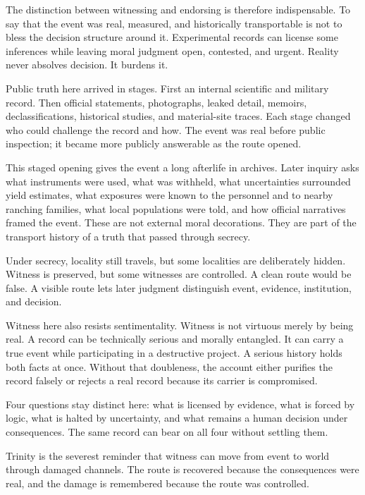 The distinction between witnessing and endorsing is therefore
indispensable. To say that the event was real, measured, and
historically transportable is not to bless the decision structure
around it. Experimental records can license some inferences while
leaving moral judgment open, contested, and urgent. Reality never
absolves decision. It burdens it.

Public truth here arrived in stages. First an internal scientific and
military record. Then official statements, photographs, leaked detail,
memoirs, declassifications, historical studies, and material-site
traces. Each stage changed who could challenge the record and how. The event was
real before public inspection; it became more publicly answerable as the
route opened.

This staged opening gives the event a long afterlife in archives.
Later inquiry asks what instruments were used, what was withheld, what
uncertainties surrounded yield estimates, what exposures were known to
the personnel and to nearby ranching families, what local populations
were told, and how official narratives framed the event. These are not
external moral decorations. They are part of the transport history of a
truth that passed through secrecy.

Under secrecy, locality still travels, but some localities are
deliberately hidden. Witness is preserved, but some witnesses are
controlled. A clean route would be false. A visible route
lets later judgment distinguish event, evidence, institution, and
decision.

Witness here also resists sentimentality. Witness is not virtuous
merely by being real. A record can be technically serious and morally
entangled. It can carry a true event while participating in a
destructive project. A serious history holds both facts at once. Without
that doubleness, the account either purifies the record falsely or
rejects a real record because its carrier is compromised.

Four questions stay distinct here: what is licensed by evidence, what is
forced by logic, what is halted by uncertainty, and what remains a human
decision under consequences. The same record can bear on all four
without settling them.

Trinity is the severest reminder that witness can move from event to
world through damaged channels. The route is recovered because the
consequences were real, and the damage is remembered because the route
was controlled.

